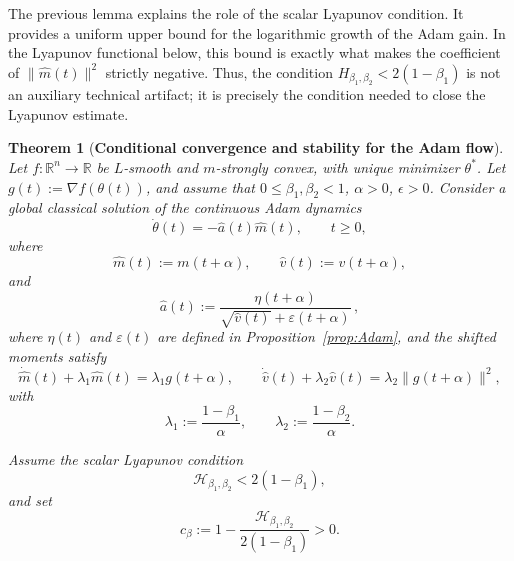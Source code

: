 \documentclass{article} %
\newtheorem{theorem}{Theorem}
\begin{document}
The previous lemma explains the role of the scalar Lyapunov condition. It provides a uniform upper bound for the logarithmic growth of the Adam gain. In the Lyapunov functional below, this bound is exactly what makes the coefficient of \(\|\widehat m(t)\|^2\) strictly negative. Thus, the condition \(H_{\beta_1,\beta_2}<2(1-\beta_1)\) is not an auxiliary technical artifact; it is precisely the condition needed to close the Lyapunov estimate.

\begin{theorem}[\textbf{Conditional convergence and stability for the Adam flow}]
\label{thm:adam_shifted}
Let \(f:\mathbb R^n\to\mathbb R\) be \(L\)-smooth and \(m\)-strongly convex, with unique minimizer \(\theta^*\). Let $g(t):=\nabla f(\theta(t))$, and assume that \(0\leq\beta_1,\beta_2<1\), \(\alpha>0\), \(\epsilon>0\). Consider a global classical solution of the continuous Adam dynamics
\begin{equation}\label{eq:adam_shifted_dyn}
    \dot\theta(t)
    =
    -
    \widehat a(t)\widehat m(t),
    \qquad t\geq0,
\end{equation}
where
\[
    \widehat m(t):=m(t+\alpha),
    \qquad
    \widehat v(t):=v(t+\alpha),
\]
and
\begin{equation}\label{eq:ahat_def}
    \widehat a(t)
    :=
    \frac{\eta(t+\alpha)}
    {\sqrt{\widehat v(t)}+\varepsilon(t+\alpha)}\,,
\end{equation}
where $\eta(t)$ and $\varepsilon(t)$ are defined in Proposition~\ref{prop:Adam}, and the shifted moments satisfy
\begin{equation}\label{eq:shifted_moment_odes}
    \dot{\widehat m}(t)+\lambda_1\widehat m(t)
    =
    \lambda_1 g(t+\alpha),
    \qquad
    \dot{\widehat v}(t)+\lambda_2\widehat v(t)
    =
    \lambda_2\|g(t+\alpha)\|^2,
\end{equation}
with
\[
    \lambda_1:=\frac{1-\beta_1}{\alpha},
    \qquad
    \lambda_2:=\frac{1-\beta_2}{\alpha}.
\]

Assume the scalar Lyapunov condition
\begin{equation}\label{eq:H_condition_theorem}
    \mathcal H_{\beta_1,\beta_2}
    <
    2(1-\beta_1),
\end{equation}
and set
\[
    c_\beta
    :=
    1-
    \frac{\mathcal H_{\beta_1,\beta_2}}
    {2(1-\beta_1)}
    >0.
\]


\end{theorem}
\end{document}
